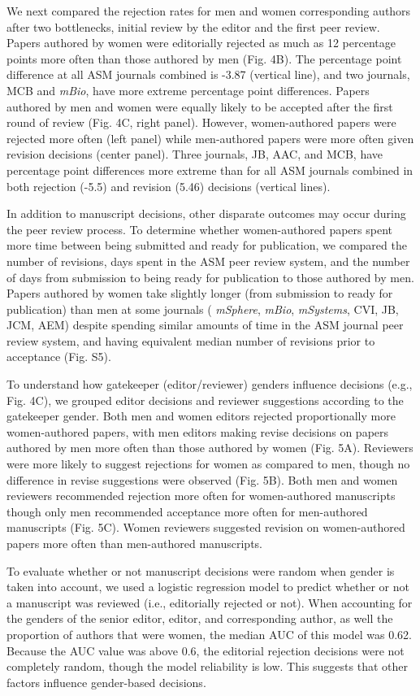 \documentclass[11pt,]{article}
\begin{document}
We next compared the rejection rates for men and women corresponding
authors after two bottlenecks, initial review by the editor and the
first peer review. Papers authored by women were editorially rejected as
much as 12 percentage points more often than those authored by men (Fig.
4B). The percentage point difference at all ASM journals combined is
-3.87 (vertical line), and two journals, MCB and \emph{mBio}, have more
extreme percentage point differences. Papers authored by men and women
were equally likely to be accepted after the first round of review (Fig.
4C, right panel). However, women-authored papers were rejected more
often (left panel) while men-authored papers were more often given
revision decisions (center panel). Three journals, JB, AAC, and MCB,
have percentage point differences more extreme than for all ASM journals
combined in both rejection (-5.5) and revision (5.46) decisions
(vertical lines).

In addition to manuscript decisions, other disparate outcomes may occur
during the peer review process. To determine whether women-authored
papers spent more time between being submitted and ready for
publication, we compared the number of revisions, days spent in the ASM
peer review system, and the number of days from submission to being
ready for publication to those authored by men. Papers authored by women
take slightly longer (from submission to ready for publication) than men
at some journals ( \emph{mSphere}, \emph{mBio}, \emph{mSystems}, CVI,
JB, JCM, AEM) despite spending similar amounts of time in the ASM
journal peer review system, and having equivalent median number of
revisions prior to acceptance (Fig. S5).

To understand how gatekeeper (editor/reviewer) genders influence
decisions (e.g., Fig. 4C), we grouped editor decisions and reviewer
suggestions according to the gatekeeper gender. Both men and women
editors rejected proportionally more women-authored papers, with men
editors making revise decisions on papers authored by men more often
than those authored by women (Fig. 5A). Reviewers were more likely to
suggest rejections for women as compared to men, though no difference in
revise suggestions were observed (Fig. 5B). Both men and women reviewers
recommended rejection more often for women-authored manuscripts though
only men recommended acceptance more often for men-authored manuscripts
(Fig. 5C). Women reviewers suggested revision on women-authored papers
more often than men-authored manuscripts.

To evaluate whether or not manuscript decisions were random when gender
is taken into account, we used a logistic regression model to predict
whether or not a manuscript was reviewed (i.e., editorially rejected or
not). When accounting for the genders of the senior editor, editor, and
corresponding author, as well the proportion of authors that were women,
the median AUC of this model was 0.62. Because the AUC value was above
0.6, the editorial rejection decisions were not completely random,
though the model reliability is low. This suggests that other factors
influence gender-based decisions.
\end{document}
